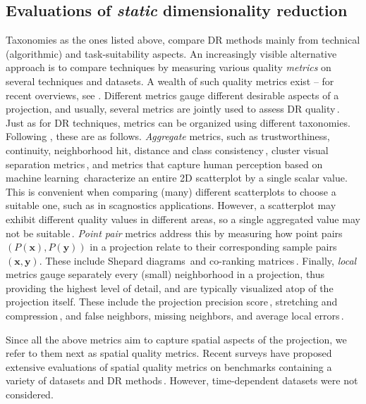 \subsection{Evaluations of \emph{static} dimensionality reduction}
\label{sec:eval_static}
%
Taxonomies as the ones listed above, compare DR methods mainly from technical (algorithmic) and task-suitability aspects. An increasingly visible alternative approach is to compare techniques by measuring various quality \emph{metrics} on several techniques and datasets. A wealth of such quality metrics exist -- for recent overviews, see \citep{polzlbauer04_survey,Lee2009,lueks13,Nonato2019,Espadoto19}. Different metrics gauge different desirable aspects of a projection, and usually, several metrics are jointly used to assess DR quality\,\citep{gisbrecht15}. Just as for DR techniques, metrics can be organized using different taxonomies. Following \citep{Espadoto19}, these are as follows. \emph{Aggregate} metrics, such as trustworthiness, continuity, neighborhood hit, distance and class consistency\,\citep{sips09,tatu10}, cluster visual separation metrics\,\citep{albuquerque11,sedlmair13,sedlmair15}, and metrics that capture human perception based on machine learning\,\citep{sedlmair16} characterize an entire 2D scatterplot by a single scalar value. This is convenient when comparing (many) different scatterplots to choose a suitable one, such as in scagnostics applications. However, a scatterplot may exhibit different quality values in different areas, so a single aggregated value may not be suitable\,\citep{Joia2011,Nonato2019}. \emph{Point pair} metrics address this by measuring how point pairs $(P(\mathbf{x}), P(\mathbf{y}))$ in a projection relate to their corresponding sample pairs $(\mathbf{x}, \mathbf{y})$. These include Shepard diagrams\,\citep{Joia2011} and co-ranking matrices\,\citep{Lee2009}. Finally, \emph{local} metrics gauge separately every (small) neighborhood in a projection, thus providing the highest level of detail, and are typically visualized atop of the projection itself. These include the projection precision score\,\citep{schreck10}, stretching and compression\,\citep{aupetit07,lespinats11}, and false neighbors, missing neighbors, and average local errors\,\citep{Martins2014,Martins2015}.

Since all the above metrics aim to capture spatial aspects of the projection, we refer to them next as spatial quality metrics. Recent surveys have proposed extensive evaluations of spatial quality metrics on benchmarks containing a variety of datasets and DR methods\,\citep{Espadoto19,vanderMaaten2009}. However, time-dependent datasets were not considered.

